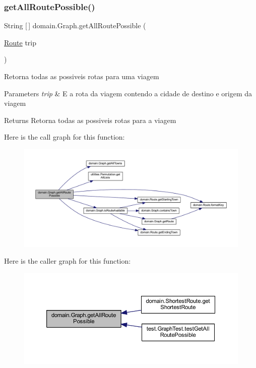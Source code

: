 \subsubsection{\texorpdfstring{get\+All\+Route\+Possible()}{getAllRoutePossible()}}
{\footnotesize\ttfamily String \mbox{[}$\,$\mbox{]} domain.\+Graph.\+get\+All\+Route\+Possible (\begin{DoxyParamCaption}\item[{\hyperlink{classdomain_1_1_route}{Route}}]{trip }\end{DoxyParamCaption})}

Retorna todas as possiveis rotas para uma viagem


\begin{DoxyParams}{Parameters}
{\em trip} & E a rota da viagem contendo a cidade de destino e origem da viagem \\
\hline
\end{DoxyParams}
\begin{DoxyReturn}{Returns}
Retorna todas as possiveis rotas para a viagem 
\end{DoxyReturn}
Here is the call graph for this function\+:\nopagebreak
\begin{figure}[H]
\begin{center}
\leavevmode
\includegraphics[width=350pt]{classdomain_1_1_graph_a3ceedf597c66f500579a0e302c32062b_cgraph}
\end{center}
\end{figure}
Here is the caller graph for this function\+:\nopagebreak
\begin{figure}[H]
\begin{center}
\leavevmode
\includegraphics[width=350pt]{classdomain_1_1_graph_a3ceedf597c66f500579a0e302c32062b_icgraph}
\end{center}
\end{figure}
\mbox{\label{classdomain_1_1_graph_aa91cc429a4ea1d2c3341baea617e4028}} 
